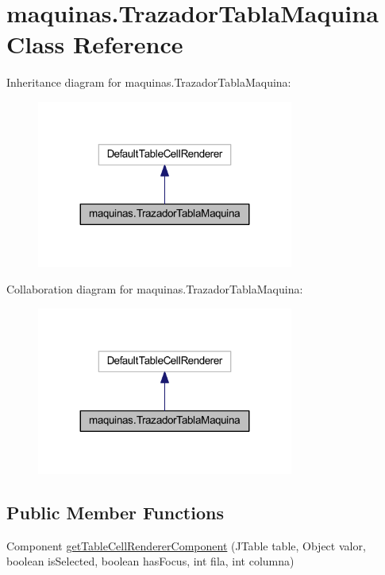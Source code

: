 \hypertarget{classmaquinas_1_1_trazador_tabla_maquina}{}\section{maquinas.\+Trazador\+Tabla\+Maquina Class Reference}
\label{classmaquinas_1_1_trazador_tabla_maquina}


Inheritance diagram for maquinas.\+Trazador\+Tabla\+Maquina\+:
\nopagebreak
\begin{figure}[H]
\begin{center}
\leavevmode
\includegraphics[width=239pt]{classmaquinas_1_1_trazador_tabla_maquina__inherit__graph}
\end{center}
\end{figure}


Collaboration diagram for maquinas.\+Trazador\+Tabla\+Maquina\+:
\nopagebreak
\begin{figure}[H]
\begin{center}
\leavevmode
\includegraphics[width=239pt]{classmaquinas_1_1_trazador_tabla_maquina__coll__graph}
\end{center}
\end{figure}
\subsection*{Public Member Functions}
\begin{DoxyCompactItemize}
\item 
Component \mbox{\hyperlink{classmaquinas_1_1_trazador_tabla_maquina_af06b2906b95905c50f88f0bf43d72519}{get\+Table\+Cell\+Renderer\+Component}} (J\+Table table, Object valor, boolean is\+Selected, boolean has\+Focus, int fila, int columna)
\end{DoxyCompactItemize}



